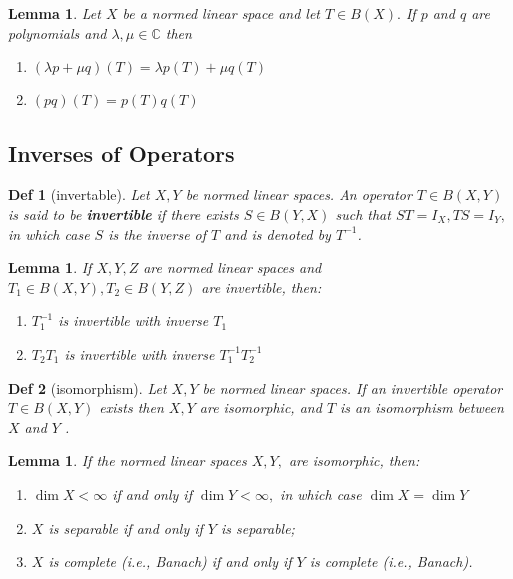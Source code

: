 \documentclass[10pt]{paper}
\newtheorem{definition}{Def}[section]
\newtheorem{lemma}[theorem]{Lemma}
\begin{document}
\begin{lemma}
    Let $X$ be a normed linear space and let $T \in B(X) .$ If $p$ and $q$ are polynomials and $\lambda, \mu \in \mathbb{C}$ then
    \begin{enumerate}
        \item $(\lambda p+\mu q)(T)=\lambda p(T)+\mu q(T)$
        \item $(p q)(T)=p(T) q(T)$
    \end{enumerate}
\end{lemma}

\subsection{Inverses of Operators }

\begin{definition}[invertable]
    Let $X, Y$ be normed linear spaces. An operator $T \in B(X, Y)$ is said to be \textbf{invertible} if there exists $S \in B(Y, X)$ such that $S T=I_{X}, T S=I_{Y},$ in which case $S$ is the inverse of $T$ and is denoted by $T^{-1}$.
\end{definition}

\begin{lemma}
    If $X, Y, Z$ are normed linear spaces and $T_{1} \in B(X, Y), T_{2} \in B(Y, Z)$ are invertible, then:
    \begin{enumerate}
        \item $T_{1}^{-1}$ is invertible with inverse $T_{1}$
        \item $T_{2} T_{1}$ is invertible with inverse $T_{1}^{-1} T_{2}^{-1}$
    \end{enumerate}
\end{lemma}

\begin{definition}[isomorphism]
    Let $X, Y$ be normed linear spaces. If an invertible operator $T \in B(X, Y)$ exists then $X, Y$ are isomorphic, and $T$ is an isomorphism between $X$ and $Y$ .
\end{definition}

\begin{lemma}
    If the normed linear spaces $X, Y,$ are isomorphic, then:
    \begin{enumerate}
        \item  $\operatorname{dim} X<\infty$ if and only if $\operatorname{dim} Y<\infty,$ in which case $\operatorname{dim} X=\operatorname{dim} Y$
        \item $X$ is separable if and only if $Y$ is separable;
        \item $X$ is complete (i.e., Banach) if and only if $Y$ is complete (i.e., Banach).
    \end{enumerate}
\end{lemma}
\end{document}
